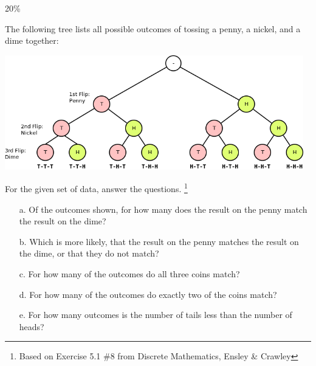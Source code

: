 \documentclass[a4paper,12pt]{book}
\begin{document}
        \newpage
        \begin{question}{6}{20\%}

            The following tree lists all possible outcomes of tossing a penny,
            a nickel, and a dime together:

            \begin{center}
                \includegraphics[width=13cm]{images/5-1-gametree.png}
            \end{center}

            For the given set of data, answer the questions.
            \footnote{Based on Exercise 5.1 \#8 from Discrete Mathematics, Ensley \& Crawley}

            \begin{enumerate}
                \item[a.] Of the outcomes shown, for how many does
                the result on the penny match the result on the dime?

                \item[b.] Which is more likely, that the result on the penny
                matches the result on the dime, or that they do not match?

                \item[c.] For how many of the outcomes do all three coins match?

                \item[d.] For how many of the outcomes do exactly two of the coins match?

                \item[e.] For how many outcomes is the number of tails less than the number of heads?
            \end{enumerate}
            
        \end{question}
        
\end{document}
